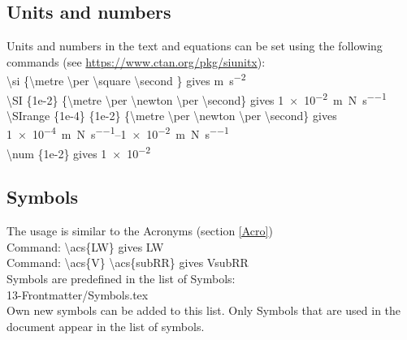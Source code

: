 \subsection{Units and numbers}
%
Units and numbers in the text and equations can be set using the following commands (see \url{https://www.ctan.org/pkg/siunitx}):
\\
\textbackslash si  \{\textbackslash metre \textbackslash per \textbackslash square \textbackslash second \} gives \si{\metre \per \square \second}
\\
\textbackslash SI  \{1e-2\} \{\textbackslash metre \textbackslash per \textbackslash newton \textbackslash per \textbackslash second\} gives \SI{1e-2}{\metre\per\newton\per\second}
\\
\textbackslash SIrange  \{1e-4\} \{1e-2\} \{\textbackslash metre \textbackslash per \textbackslash newton \textbackslash per \textbackslash second\} gives \SIrange{1e-4}{1e-2}{\metre\per\newton\per\second}
\\
\textbackslash num  \{1e-2\} gives \num{1e-2}


\subsection{Symbols}
%
The usage is similar to the Acronyms (section \ref{Acro})\\
Command: \textbackslash acs\{LW\} gives \acs{LW}
\\
Command: \textbackslash acs\{V\} \textbackslash acs\{subRR\} gives \acs{V}\acs{subRR}
\\
Symbols are predefined in the list of Symbols:\\
13-Frontmatter/Symbols.tex
\\
Own new symbols can be added to this list. 
Only Symbols that are used in the document appear in the list of symbols.


